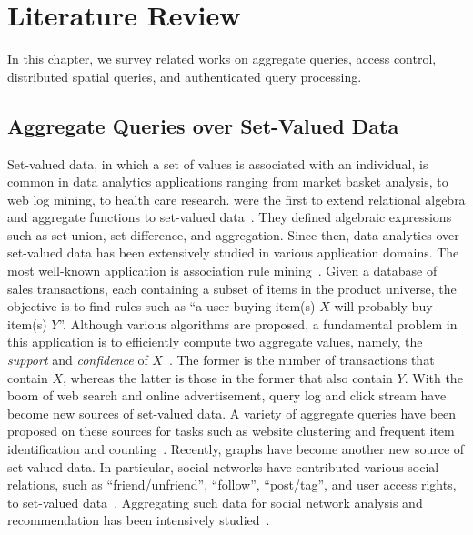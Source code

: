\chapter{Literature Review}\label{chap:related-works}

In this chapter, we survey related works on aggregate queries, access control, distributed spatial queries, and authenticated query processing.

\section{Aggregate Queries over Set-Valued Data}

Set-valued data, in which a set of values is associated with an individual, is common in data analytics applications ranging from market basket analysis, to web log mining, to health care research. \citeauthor{10.1145/32204.32219} were the first to extend relational algebra and aggregate functions to set-valued data~\cite{10.1145/32204.32219}. They defined algebraic expressions such as set union, set difference, and aggregation. Since then, data analytics over set-valued data has been extensively studied in various application domains. The most well-known application is association rule mining~\cite{10.1145/170035.170072}. Given a database of sales transactions, each containing a subset of items in the product universe, the objective is to find rules such as ``a user buying item(s) $X$ will probably buy item(s) $Y$''. Although various algorithms are proposed, a fundamental problem in this application is to efficiently compute two aggregate values, namely, the \emph{support} and \emph{confidence} of $X$~\cite{Agrawal:1994:FAM:645920.672836}. The former is the number of transactions that contain $X$, whereas the latter is those in the former that also contain $Y$. With the boom of web search and online advertisement, query log and click stream have become new sources of set-valued data. A variety of aggregate queries have been proposed on these sources for tasks such as website clustering and frequent item identification and counting~\cite{10.14778/2367502.2367508}. Recently, graphs have become another new source of set-valued data. In particular, social networks have contributed various social relations, such as ``friend/unfriend'', ``follow'', ``post/tag'', and user access rights, to set-valued data~\cite{10.1145/1592568.1592585}. Aggregating such data for social network analysis and recommendation has been intensively studied~\cite{10.1145/1367497.1367646}.


